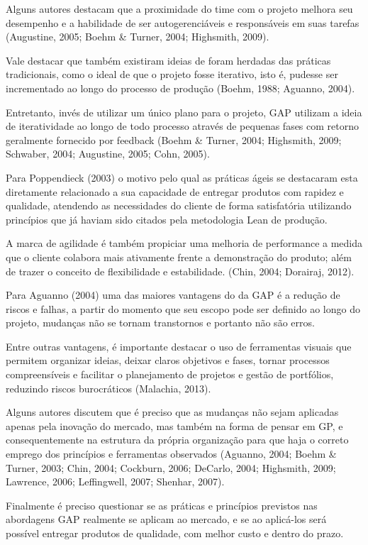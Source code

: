 Alguns autores destacam que a proximidade do time com o projeto melhora seu desempenho e a habilidade de ser autogerenciáveis e responsáveis em suas tarefas (Augustine, 2005; Boehm \& Turner, 2004; Highsmith, 2009).

Vale destacar que também existiram ideias de foram herdadas das práticas tradicionais, como o ideal de que o projeto fosse iterativo, isto é, pudesse ser incrementado ao longo do processo de produção (Boehm, 1988; Aguanno, 2004).

Entretanto, invés de utilizar um único plano para o projeto, GAP utilizam a ideia de iteratividade ao longo de todo processo através de pequenas fases com retorno geralmente fornecido por feedback (Boehm \& Turner, 2004; Highsmith, 2009; Schwaber, 2004; Augustine, 2005; Cohn, 2005).

Para Poppendieck (2003) o motivo pelo qual as práticas ágeis se destacaram esta diretamente relacionado a sua capacidade de entregar produtos com rapidez e qualidade, atendendo as necessidades do cliente de forma satisfatória utilizando princípios que já haviam sido citados pela metodologia Lean de produção.

A marca de agilidade é também propiciar uma melhoria de performance a medida que o cliente colabora mais ativamente frente a demonstração do produto; além de trazer o conceito de flexibilidade e estabilidade. (Chin, 2004; Dorairaj, 2012).

Para Aguanno (2004) uma das maiores vantagens do da GAP é a redução de riscos e falhas, a partir do momento que seu escopo pode ser definido ao longo do projeto, mudanças não se tornam transtornos e portanto não são erros.

Entre outras vantagens, é importante destacar o uso de ferramentas visuais que permitem organizar ideias, deixar claros objetivos e fases, tornar processos compreensíveis e facilitar o planejamento de projetos e gestão de portfólios, reduzindo riscos burocráticos (Malachia, 2013).

Alguns autores discutem que é preciso que as mudanças não sejam aplicadas apenas pela inovação do mercado, mas também na forma de pensar em GP, e consequentemente na estrutura da própria organização para que haja o correto emprego dos princípios e ferramentas observados (Aguanno, 2004; Boehm \& Turner, 2003; Chin, 2004; Cockburn, 2006; DeCarlo, 2004; Highsmith, 2009; Lawrence, 2006; Leffingwell, 2007; Shenhar, 2007).

Finalmente é preciso questionar se as práticas e princípios previstos nas abordagens GAP realmente se aplicam ao mercado, e se ao aplicá-los será possível entregar produtos de qualidade, com melhor custo e dentro do prazo.


